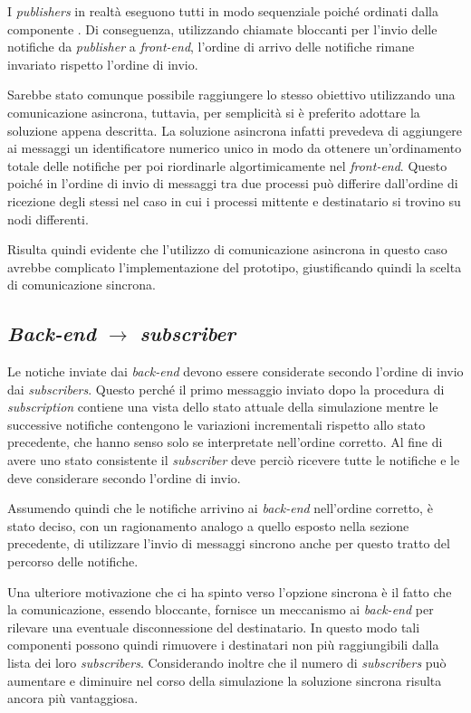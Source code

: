 I \textit{publishers} in realtà eseguono tutti in modo sequenziale poiché ordinati dalla componente \sched{}. Di conseguenza, utilizzando chiamate bloccanti per l'invio delle notifiche da \textit{publisher} a \textit{front-end}, l'ordine di arrivo delle notifiche rimane invariato rispetto l'ordine di invio.

Sarebbe stato comunque possibile raggiungere lo stesso obiettivo utilizzando una comunicazione asincrona, tuttavia, per semplicità si è preferito adottare la soluzione appena descritta. La soluzione asincrona infatti prevedeva di aggiungere ai messaggi un identificatore numerico unico in modo da ottenere un'ordinamento totale delle notifiche per poi riordinarle algortimicamente nel \textit{front-end}. Questo poiché in \Erlang{} l'ordine di invio di messaggi tra due processi può differire dall'ordine di ricezione degli stessi nel caso in cui i processi mittente e destinatario si trovino su nodi differenti.

Risulta quindi evidente che l'utilizzo di comunicazione asincrona in questo caso avrebbe complicato l'implementazione del prototipo, giustificando quindi la scelta di comunicazione sincrona.

\subsection*{\textit{Back-end} $\rightarrow$ \textit{subscriber}}
Le notiche inviate dai \textit{back-end} devono essere considerate secondo l'ordine di invio dai \textit{subscribers}. Questo perché il primo messaggio inviato dopo la procedura di \textit{subscription} contiene una vista dello stato attuale della simulazione mentre le successive notifiche contengono le variazioni incrementali rispetto allo stato precedente, che hanno senso solo se interpretate nell'ordine corretto. Al fine di avere uno stato consistente il \textit{subscriber} deve perciò ricevere tutte le notifiche e le deve considerare secondo l'ordine di invio.

Assumendo quindi che le notifiche arrivino ai \textit{back-end} nell'ordine corretto, è stato deciso, con un ragionamento analogo a quello esposto nella sezione precedente, di utilizzare l'invio di messaggi sincrono anche per questo tratto del percorso delle notifiche.

Una ulteriore motivazione che ci ha spinto verso l'opzione sincrona è il fatto che la comunicazione, essendo bloccante, fornisce un meccanismo ai \textit{back-end} per rilevare una eventuale disconnessione del destinatario. In questo modo tali componenti possono quindi rimuovere i destinatari non più raggiungibili dalla lista dei loro \textit{subscribers}. Considerando inoltre che il numero di \textit{subscribers} può aumentare e diminuire nel corso della simulazione la soluzione sincrona risulta ancora più vantaggiosa.

